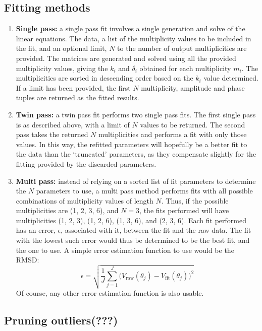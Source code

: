 \documentclass[11pt, oneside, draft]{article}   	%
\begin{document}
\subsection{Fitting methods}
\begin{enumerate}[label=\alph*)]
\item \textbf{Single pass:} a single pass fit involves a single generation and solve of the linear equations. The data, a list of the multiplicity values to be included in the fit, and an optional limit, $N$ to the number of output multiplicities are provided. The matrices are generated and solved using all the provided multiplicity values, giving the $k_{i}$ and $\delta_{i}$ obtained for each multiplicity $m_{i}$. The multiplicities are sorted in descending order based on the $k_{i}$ value determined. If a limit has been provided, the first $N$ multiplicity, amplitude and phase tuples are returned as the fitted results.
\item \textbf{Twin pass:} a twin pass fit performs two single pass fits. The first single pass is as described above, with a limit of $N$ values to be returned. The second pass takes the returned $N$ multiplicities and performs a fit with only those values. In this way, the refitted parameters will hopefully be a better fit to the data than the `truncated' parameters, as they compensate slightly for the fitting provided by the discarded parameters.
\item \textbf{Multi pass:} instead of relying on a sorted list of fit parameters to determine the $N$ parameters to use, a multi pass method performs fits with all possible combinations of multiplicity values of length $N$. Thus, if the possible multiplicities are (1, 2, 3, 6), and $N = 3$, the fits performed will have multiplicities (1, 2, 3), (1, 2, 6), (1, 3, 6), and (2, 3, 6). Each fit performed has an error, $\epsilon$, associated with it, between the fit and the raw data. The fit with the lowest such error would thus be determined to be the best fit, and the one to use. A simple error estimation function to use would be the RMSD:
\begin{equation}
\epsilon = \sqrt{\frac{1}{J}\sum_{j=1}^{J}\big(V_{\text{raw}}(\theta_{j}) - V_{\text{fit}}(\theta_{j})\big)^{2}}
\end{equation}
Of course, any other error estimation function is also usable.

\end{enumerate}
\subsection{Pruning outliers(???)}
\end{document}

